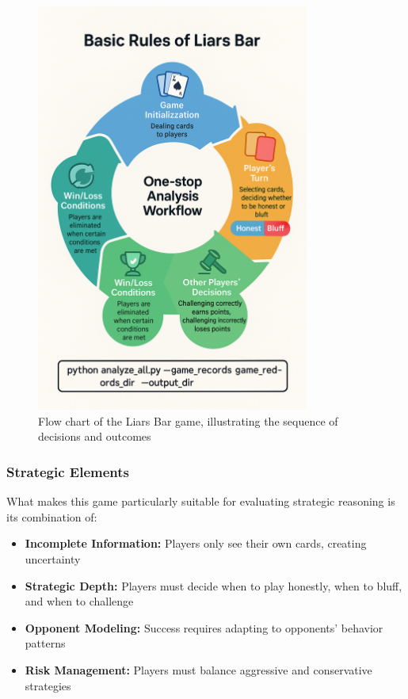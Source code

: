 \documentclass{article}
\begin{document}
\begin{figure}[H]
    \centering
    \includegraphics[width=0.8\textwidth]{figures/game_flow.png}
    \caption{Flow chart of the Liars Bar game, illustrating the sequence of decisions and outcomes}
    \label{fig:game_flow}
\end{figure}

\subsubsection{Strategic Elements}
What makes this game particularly suitable for evaluating strategic reasoning is its combination of:
\begin{itemize}
    \item \textbf{Incomplete Information:} Players only see their own cards, creating uncertainty
    \item \textbf{Strategic Depth:} Players must decide when to play honestly, when to bluff, and when to challenge
    \item \textbf{Opponent Modeling:} Success requires adapting to opponents' behavior patterns
    \item \textbf{Risk Management:} Players must balance aggressive and conservative strategies
\end{itemize}
\end{document}
